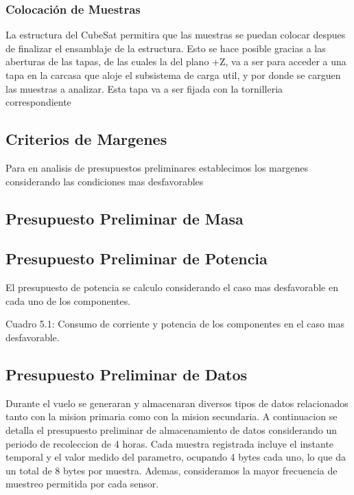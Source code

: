     \subsubsection{Colocación de Muestras}

      La estructura del CubeSat permitira que las muestras se puedan colocar despues de
      finalizar el ensamblaje de la estructura. Esto se hace posible gracias a las aberturas de las
      tapas, de las cuales la del plano +Z, va a ser para acceder a una tapa en la carcasa que aloje
      el subsistema de carga util, y por donde se carguen las muestras a analizar. Esta tapa va a
      ser fijada con la tornilleria correspondiente

  \subsection{Criterios de Margenes}
    Para en analisis de presupuestos preliminares establecimos los margenes considerando las
    condiciones mas desfavorables

  \subsection{Presupuesto Preliminar de Masa}

  \subsection{Presupuesto Preliminar de Potencia}
    El presupuesto de potencia se calculo considerando el caso mas desfavorable en cada uno
    de los componentes.

    Cuadro 5.1: Consumo de corriente y potencia de los componentes en el caso mas desfavorable.

  \subsection{Presupuesto Preliminar de Datos}
    Durante el vuelo se generaran y almacenaran diversos tipos de datos relacionados tanto
    con la mision primaria como con la mision secundaria. A continuacion se detalla el presupuesto preliminar de almacenamiento de datos considerando un periodo de recoleccion de 4
    horas.
    Cada muestra registrada incluye el instante temporal y el valor medido del parametro, ocupando 4 bytes cada uno, lo que da un total de 8 bytes por muestra. Ademas, consideramos
    la mayor frecuencia de muestreo permitida por cada sensor.



